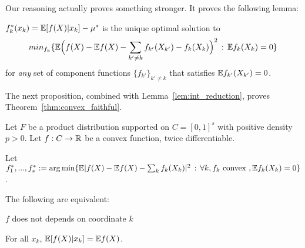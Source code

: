 Our reasoning actually proves something stronger. It proves the following lemma:

\begin{lemma}
\label{lem:additive_component}

$f^*_k(x_k) = {\mathbb E}[ f(X) | x_k] - \mu^*$ is the unique optimal solution to 
\[
min_{f_k} \{ {\mathbb E}\Big( f(X) - {\mathbb E} f(X) - \sum_{k'\neq k} f_{k'}(X_{k'}) - f_k (X_k)\Big)^2 
                    \,:\, {\mathbb E} f_k(X_k) = 0 \}
\]
for \emph{any} set of component functions $\{ f_{k'} \}_{k'\neq k}$ that satisfies ${\mathbb E} f_{k'}(X_{k'}) = 0$.
\end{lemma}


 The next proposition, combined with Lemma~\ref{lem:int_reduction}, proves Theorem~\ref{thm:convex_faithful}.
 
 \begin{proposition}
Let $F$ be a product distribution supported on $C=[0,1]^s$ with positive density $p > 0$. Let $f: C \rightarrow {\mathbb R}$ be a convex function, twice differentiable. 

Let $f^*_1,...,f^*_s := \arg\min \{ {\mathbb E} | f(X) -{\mathbb E} f(X) - \sum_k f_k(X_k) |^2 \,:\, \forall k, f_k \textrm{ convex }, {\mathbb E} f_k(X_k) = 0\}$.

The following are equivalent:
\begin{packed_enum}
\item $f$ does not depends on coordinate $k$
\item For all $x_k$, ${\mathbb E}[ f(X) | x_k] = {\mathbb E} f(X) $.
\end{packed_enum}
\end{proposition}

